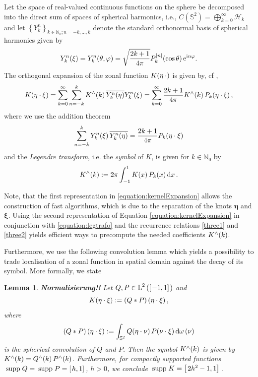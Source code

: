 \documentclass[11pt,a4paper,twoside,bibtotoc]{scrartcl}
\theoremstyle{plain}
\newtheorem{lemma}[theorem]{Lemma}
\theoremstyle{definition}
\theoremstyle{remark}
\newcommand{\supp}{\:{\rm supp}}
\newcommand{\NZ}{\ensuremath{\mathbb{N}_{0}}}
\newcommand{\set}[1]{\ensuremath{\left\{#1\right\rbrace}}
\newcommand{\twosphere}{\ensuremath{\mathbb{S}^2}}
\newcommand{\Ln}[2]{\ensuremath{\text{\rm{L}}^{#1}\left(#2\right)}}
\newcommand{\interv}[4]{\ensuremath{\left#1\left.#2,#3\right#4\right.}}
\newcommand{\fun}[2]{\ensuremath{#1{\hspace{-0.4ex}}\left(#2\right)}}
\newcommand{\mb}[1]{\mathbf{#1}}
\newcommand{\V}[1]{\mb{#1}}
\newcommand{\dx}{\text{\rm{d}}}
\newcommand{\e}{\mbox{\rm{e}}}
\newcommand{\im}{\mbox{\scriptsize\rm{i}}}
\numberwithin{equation}{section}
\numberwithin{table}{section}
\numberwithin{figure}{section}
\begin{document}
Let the space of real-valued continuous functions on the sphere be decomposed
into the direct sum of spaces of spherical harmonics, i.e.,
$C(\twosphere)=\bigoplus_{k=0}^{\infty} \mathcal{H}_k$ and let
$\set{Y_{k}^n}_{k \in \NZ; n=-k,\ldots,k}$ denote the 
standard orthonormal basis of spherical harmonics given by
\[
  \fun{Y_{k}^n}{\V{\xi}} = \fun{Y_{k}^n}{\theta,\varphi} = 
  \sqrt{\frac{2k+1}{4\pi}} 
  \fun{P_{k}^{|n|}}{\cos\theta} \e^{\im n \varphi}.
\]
The orthogonal expansion of the zonal function $\fun{K}{\V{\eta} \: \cdot}$
is given by, cf \cite{XXX},
\begin{equation}
  \label{equation:kernelExpansion}
  \fun{K}{\V{\eta} \cdot \V{\xi}} = \sum_{k = 0}^{\infty} \sum_{n=-k}^k
  \fun{K^{\wedge}}{k}\overline{\fun{Y_{k}^n}{\V{\eta}}} \fun{Y_{k}^n}{\V{\xi}}
  = \sum_{k = 0}^{\infty} \frac{2k+1}{4\pi} \fun{K^{\wedge}}{k}
  \fun{P_{k}}{\V{\eta} \cdot \V{\xi}},
\end{equation}
where we use the addition theorem
\[
\sum_{n=-k}^{k} \fun{Y_{k}^n}{\V{\xi}} \overline{\fun{Y_{k}^n}{\V{\eta}}} =
    \frac{2k+1}{4\pi}\fun{P_k}{\V{\eta} \cdot \V{\xi}}
\]
and the \emph{Legendre transform}, i.e. the \emph{symbol} of $K$, is given
for $k \in \NZ$ by
\begin{equation}
  \label{equation:legtrafo}
  \fun{K^{\wedge}}{k} := 2 \pi \int_{-1}^{1} \fun{K}{x} \fun{P_{k}}{x} \dx 
  x\,.
\end{equation}

Note, that the first representation in \eqref{equation:kernelExpansion} allows
the construction of fast algorithms, which is due to the separation of the
knots $\V{\eta}$ and $\V{\xi}$.
Using the second representation of Equation \eqref{equation:kernelExpansion} in
conjunction with \eqref{equation:legtrafo} and the recurrence relations
\eqref{three1} and \eqref{three2} yields efficient ways to precompute the
needed coefficients $\fun{K^{\wedge}}{k}$.

Furthermore, we use the following convolution lemma which yields a possibility to trade
localisation of a zonal function in spatial domain against the decay of its
symbol.
More formally, we state
\begin{lemma} {\bf Normalisierung!!}
  Let $Q,P\in \Ln{2}{\interv{[}{-1}{1}{]}}$ and
  \[
  \fun{K}{\V{\eta} \cdot \V{\xi}} := \fun{\left(Q * P\right)}{\V{\eta} \cdot
    \V{\xi}},
  \]
  where
  \[
    \fun{\left(Q * P\right)}{\V{\eta} \cdot \V{\xi}}:= 
    \int_{\twosphere} \fun{Q}{\V{\eta} \cdot \V{\nu}}
    \fun{P}{\V{\nu} \cdot \V{\xi}} \dx \omega\left(\nu\right)
  \]
  is the \emph{spherical convolution} of $Q$ and $P$. Then the symbol 
  $\fun{K^{\wedge}}{k}$ is given by 
  $\fun{K^{\wedge}}{k} = \fun{Q^{\wedge}}{k} \fun{P^{\wedge}}{k}$.
  Furthermore, for compactly supported functions $\supp\; Q = \supp\; P =
  \interv{[}{h}{1}{]}$, $h>0$, we conclude $\supp\; K =
  \interv{[}{2h^2-1}{1}{]}$.
\end{lemma}
\end{document}
